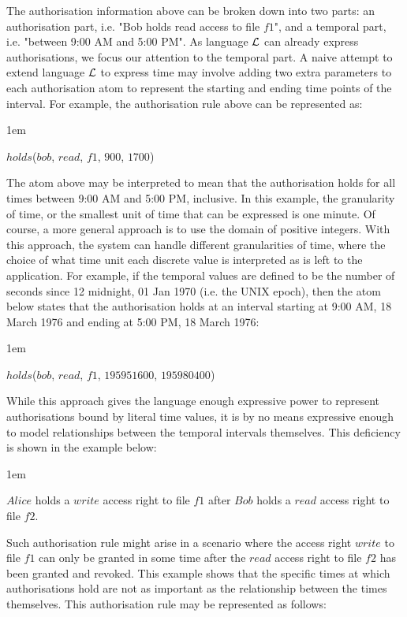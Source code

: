 \documentclass[glov2,twocolumn,final]{svjour2}
\newenvironment{vquote}
  {\begin{list}{}{\leftmargin 1em}\item[]}
  {\end{list}}
\begin{document}
    The authorisation information above can be broken down into two parts: an
    authorisation part, i.e. "Bob holds read access to file $f1$", and a
    temporal part, i.e. "between 9:00 AM and 5:00 PM". As language ${\cal L}$
    can already express authorisations, we focus our attention to the temporal
    part. A naive attempt to extend language ${\cal L}$ to express time may
    involve adding two extra parameters to each authorisation atom to represent
    the starting and ending time points of the interval. For example, the
    authorisation rule above can be represented as:

    \begin{vquote}
      $holds$($bob$, $read$, $f1$, $900$, $1700$)
    \end{vquote}

    The atom above may be interpreted to mean that the authorisation holds for
    all times between 9:00 AM and 5:00 PM, inclusive. In this example, the
    granularity of time, or the smallest unit of time that can be expressed is
    one minute. Of course, a more general approach is to use the domain of
    positive integers. With this approach, the system can handle different
    granularities of time, where the choice of what time unit each discrete
    value is interpreted as is left to the application. For example, if the
    temporal values are defined to be the number of seconds since 12 midnight,
    01 Jan 1970 (i.e. the UNIX epoch), then the atom below states that the
    authorisation holds at an interval starting at 9:00 AM, 18 March 1976 and
    ending at 5:00 PM, 18 March 1976:

    \begin{vquote}
      $holds$($bob$, $read$, $f1$, $195951600$, $195980400$)
    \end{vquote}

    While this approach gives the language enough expressive power to represent
    authorisations bound by literal time values, it is by no means expressive
    enough to model relationships between the temporal intervals themselves.
    This deficiency is shown in the example below:

    \begin{vquote}
      $Alice$ holds a $write$ access right to file $f1$ after $Bob$ holds a
      $read$ access right to file $f2$.
    \end{vquote}

    Such authorisation rule might arise in a scenario where the access right
    $write$ to file $f1$ can only be granted in some time after the $read$
    access right to file $f2$ has been granted and revoked. This example shows
    that the specific times at which authorisations hold are not as important
    as the relationship between the times themselves. This authorisation rule
    may be represented as follows:
\end{document}
